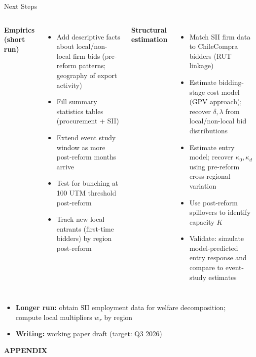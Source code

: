 \documentclass[9pt,aspectratio=169]{beamer}
\begin{document}
\begin{frame}{Next Steps}
\begin{columns}[T]
  \textbf{Empirics (short run)}
  \begin{itemize}
    \item Add descriptive facts about local/non-local firm bids
          (pre-reform patterns; geography of export activity)
    \item Fill summary statistics tables (procurement + SII)
    \item Extend event study window as more post-reform months arrive
    \item Test for bunching at 100 UTM threshold post-reform
    \item Track new local entrants (first-time bidders)
          by region post-reform
  \end{itemize}

  \textbf{Structural estimation}
  \begin{itemize}
    \item Match SII firm data to ChileCompra bidders (RUT linkage)
    \item Estimate bidding-stage cost model (GPV approach);
          recover $\delta, \lambda$ from local/non-local bid distributions
    \item Estimate entry model; recover $\kappa_0, \kappa_d$
          using pre-reform cross-regional variation
    \item Use post-reform spillovers to identify capacity $K$
    \item Validate: simulate model-predicted entry response and
          compare to event-study estimates
  \end{itemize}
\end{columns}

\bigskip
\begin{itemize}
  \item \textbf{Longer run:} obtain SII employment data for welfare
        decomposition; compute local multipliers $w_r$ by region
  \item \textbf{Writing:} working paper draft (target: Q3 2026)
\end{itemize}
\end{frame}



\begin{frame}
\centering
\textbf{APPENDIX}
\end{frame}
\end{document}
